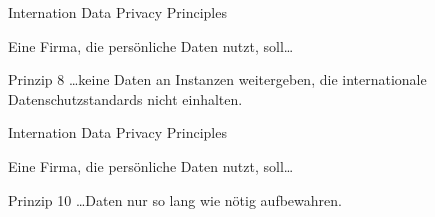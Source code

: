 \begin{frame}{Internation Data Privacy Principles}

    Eine Firma, die persönliche Daten nutzt, soll\dots

    \begin{block}{Prinzip 8 \cite{zankl_international_2014}}
        \dots keine Daten an Instanzen weitergeben, die internationale Datenschutzstandards nicht einhalten. 
    \end{block}


\end{frame}

\begin{frame}{Internation Data Privacy Principles}

    Eine Firma, die persönliche Daten nutzt, soll\dots

    \begin{block}{Prinzip 10 \cite{zankl_international_2014}}
        \dots Daten nur so lang wie nötig aufbewahren.
    \end{block}


\end{frame}